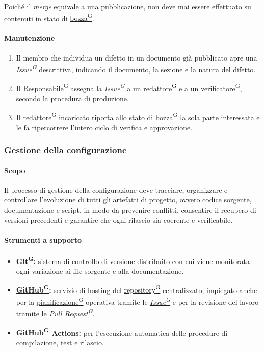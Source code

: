 \documentclass[a4paper,12pt]{article}
\providecommand{\glslink}[2]{\href{https://alittlebyte-19.github.io/Documentazione/glossario.html\#gls-#1}{\underline{#2}\textsuperscript{\scriptsize G}}}
\begin{document}
Poiché il \textit{merge} equivale a una pubblicazione, non deve mai essere effettuato su contenuti in stato di \glslink{bozza-draft}{bozza}.

\paragraph{Manutenzione}
\begin{enumerate}
    \item Il membro che individua un difetto in un documento già pubblicato apre una \textit{\glslink{issue}{Issue}} descrittiva, indicando il documento, la sezione e la natura del difetto.
    \item Il \glslink{responsabile}{Responsabile} assegna la \textit{\glslink{issue}{Issue}} a un \glslink{redattore}{redattore} e a un \glslink{verificatore}{verificatore}, secondo la procedura di produzione.
    \item Il \glslink{redattore}{redattore} incaricato riporta allo stato di \glslink{bozza-draft}{bozza} la sola parte interessata e le fa ripercorrere l'intero ciclo di verifica e approvazione.
\end{enumerate}

\subsubsection{Gestione della configurazione}

\paragraph{Scopo}
Il processo di gestione della configurazione deve tracciare, organizzare e controllare l'evoluzione di tutti gli artefatti di progetto, ovvero codice sorgente, documentazione e script, in modo da prevenire conflitti, consentire il recupero di versioni precedenti e garantire che ogni rilascio sia coerente e verificabile.

\paragraph{Strumenti a supporto}
\begin{itemize}
    \item \textbf{\glslink{git}{Git}:} sistema di controllo di versione distribuito con cui viene monitorata ogni variazione ai file sorgente e alla documentazione.
    \item \textbf{\glslink{github}{GitHub}:} servizio di hosting del \glslink{repository}{repository} centralizzato, impiegato anche per la \glslink{pianificazione}{pianificazione} operativa tramite le \textit{\glslink{issue}{Issue}} e per la revisione del lavoro tramite le \textit{\glslink{pull-request}{Pull Request}}.
    \item \textbf{\glslink{github}{GitHub} Actions:} per l'esecuzione automatica delle procedure di compilazione, test e rilascio.
\end{itemize}
\end{document}
